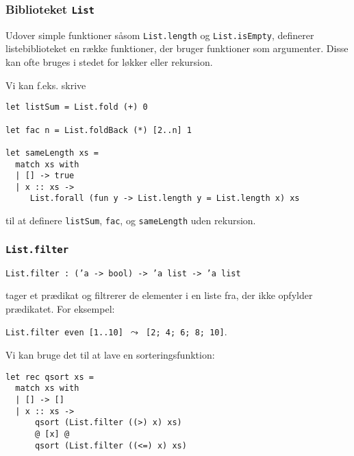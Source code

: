 \documentclass{beamer}
\begin{document}
\begin{frame}[fragile=singleslide]
\frametitle{Biblioteket \texttt{List}}

Udover simple funktioner såsom \texttt{List.length} og
\texttt{List.isEmpty}, definerer listebiblioteket en række funktioner,
der bruger funktioner som argumenter.  Disse kan ofte bruges i stedet
for løkker eller rekursion.

Vi kan f.eks. skrive

{\small
\begin{verbatim}
let listSum = List.fold (+) 0

let fac n = List.foldBack (*) [2..n] 1

let sameLength xs =
  match xs with
  | [] -> true
  | x :: xs ->
     List.forall (fun y -> List.length y = List.length x) xs
\end{verbatim}
}

til at definere \texttt{listSum}, \texttt{fac}, og \texttt{sameLength}
uden rekursion.

\end{frame}

\begin{frame}[fragile=singleslide]
\frametitle{\texttt{List.filter}}

\texttt{List.filter : ('a -> bool) -> 'a list -> 'a list}

tager et prædikat og filtrerer de elementer i en liste fra, der ikke
opfylder prædikatet.  For eksempel:

\texttt{List.filter even [1..10] $\leadsto$ [2; 4; 6; 8; 10]}.

Vi kan bruge det til at lave en sorteringsfunktion:

\begin{verbatim}
let rec qsort xs =
  match xs with
  | [] -> []
  | x :: xs ->
      qsort (List.filter ((>) x) xs)
      @ [x] @
      qsort (List.filter ((<=) x) xs)
\end{verbatim}

\end{frame}
\end{document}
